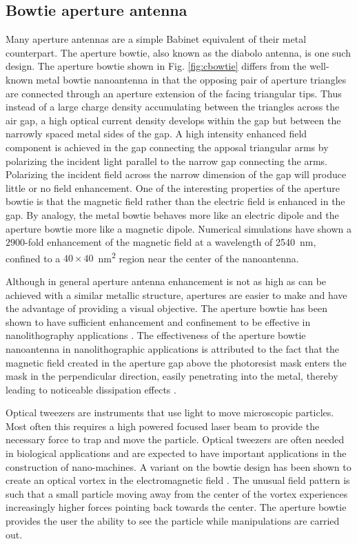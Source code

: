 \documentclass[11pt]{article}
\begin{document}
\subsection{Bowtie aperture antenna}
%
Many aperture antennas are a simple Babinet equivalent of their metal counterpart. The aperture bowtie, also known as the diabolo antenna, is one such design. The aperture bowtie shown in Fig. \ref{fig:cbowtie} differs from the well-known metal bowtie nanoantenna in that the opposing pair of aperture triangles are connected through an aperture extension of the facing triangular tips. Thus instead of a large charge density accumulating between the triangles across the air gap, a high optical current density develops within the gap but between the narrowly spaced metal sides of the gap.  A high intensity enhanced field component is achieved in the gap connecting the apposal triangular arms by polarizing the incident light parallel to the narrow gap connecting the arms. Polarizing the incident field across the narrow dimension of the gap will produce little or no field enhancement.  One of the interesting properties of the aperture bowtie is that the magnetic field rather than the electric field is enhanced in the gap. By analogy, the metal bowtie behaves more like an electric dipole and the aperture bowtie more like a magnetic dipole. Numerical
simulations have shown a $2900$-fold enhancement of the magnetic field at a wavelength of \SI{2540}{\nm}, confined to a $40\times40$\SI{}{\nm^2} region near the center of the nanoantenna.

Although in general aperture antenna enhancement is not as high as can be achieved with a similar metallic structure, apertures are easier to make and have the advantage of providing a visual objective. The aperture bowtie has been shown to have sufficient enhancement and confinement to be effective in nanolithography applications \cite{Wang2006}. The effectiveness of the aperture bowtie nanoantenna in nanolithographic applications is attributed to the fact that the magnetic field created in the aperture gap above the photoresist mask enters the mask in the perpendicular direction, easily penetrating into the metal, thereby leading to noticeable dissipation effects \cite{Grosjean2011}.

Optical tweezers are instruments that use light to move microscopic particles. Most often this requires a high powered focused laser beam to provide the necessary force to trap and move the particle. Optical tweezers are often needed in biological applications and are expected to have important applications in the construction of nano-machines. A variant on the bowtie design has been shown to create an optical vortex in the electromagnetic field \cite{Kang2011}. The unusual field pattern is such that a small particle moving away from the center of the vortex experiences increasingly higher forces pointing back towards the center. The aperture bowtie provides the user the ability to see the particle while manipulations are carried out.
\end{document}
